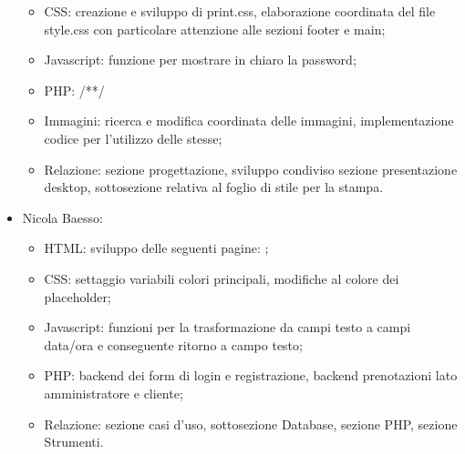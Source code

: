 \documentclass[]{article}
\begin{document}
\begin{itemize}
\begin{itemize}
		\item CSS: creazione e sviluppo di print.css, elaborazione coordinata del file style.css con particolare attenzione alle sezioni footer e main;
		\item Javascript: funzione per mostrare in chiaro la password;
		\item PHP: /**/
		\item Immagini: ricerca e modifica coordinata delle immagini, implementazione codice per l'utilizzo delle stesse;
		\item Relazione: sezione progettazione, sviluppo condiviso sezione presentazione desktop, sottosezione relativa al foglio di stile per la stampa. 
	\end{itemize} 
	\item Nicola Baesso:
	\begin{itemize}
		\item HTML: sviluppo delle seguenti pagine: ;
		\item CSS: settaggio variabili colori principali, modifiche al colore dei placeholder;
		\item Javascript: funzioni per la trasformazione da campi testo a campi data/ora e conseguente ritorno a campo testo;
		\item PHP: backend dei form di login e registrazione, backend prenotazioni lato amministratore e cliente;
		\item Relazione: sezione casi d'uso, sottosezione Database, sezione PHP, sezione Strumenti.
	\end{itemize} 
\end{itemize}
\end{document}
